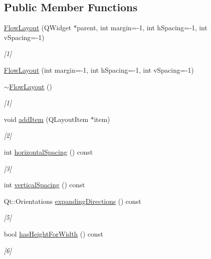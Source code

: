 \subsection*{Public Member Functions}
\begin{DoxyCompactItemize}
\item 
\hyperlink{class_flow_layout_afd3623cad3b02592123eb8a4dd01546f}{Flow\+Layout} (Q\+Widget $\ast$parent, int margin=-\/1, int h\+Spacing=-\/1, int v\+Spacing=-\/1)
\begin{DoxyCompactList}\small\item\em \mbox{[}1\mbox{]} \end{DoxyCompactList}\item 
\hyperlink{class_flow_layout_a76357c75560d6bcbee7a4782c852ca07}{Flow\+Layout} (int margin=-\/1, int h\+Spacing=-\/1, int v\+Spacing=-\/1)
\item 
\hyperlink{class_flow_layout_abcbfd03a4758b98bcf13d44f5e673551}{$\sim$\+Flow\+Layout} ()
\begin{DoxyCompactList}\small\item\em \mbox{[}1\mbox{]} \end{DoxyCompactList}\item 
void \hyperlink{class_flow_layout_a6a3f498fdac0145fe38838f31a6336cf}{add\+Item} (Q\+Layout\+Item $\ast$item)
\begin{DoxyCompactList}\small\item\em \mbox{[}2\mbox{]} \end{DoxyCompactList}\item 
int \hyperlink{class_flow_layout_a214d375a68a3590bf4b947e02eae09a3}{horizontal\+Spacing} () const 
\begin{DoxyCompactList}\small\item\em \mbox{[}3\mbox{]} \end{DoxyCompactList}\item 
int \hyperlink{class_flow_layout_a1b15dce81c6bce51290d3b55c35dcd3e}{vertical\+Spacing} () const 
\item 
Qt\+::\+Orientations \hyperlink{class_flow_layout_a2d2b5413e1e4eff15d23134208812a47}{expanding\+Directions} () const 
\begin{DoxyCompactList}\small\item\em \mbox{[}5\mbox{]} \end{DoxyCompactList}\item 
bool \hyperlink{class_flow_layout_a52203cd7f45648d9aee605b38daf4d87}{has\+Height\+For\+Width} () const 
\begin{DoxyCompactList}\small\item\em \mbox{[}6\mbox{]} \end{DoxyCompactList}\item 

\end{DoxyCompactItemize}
